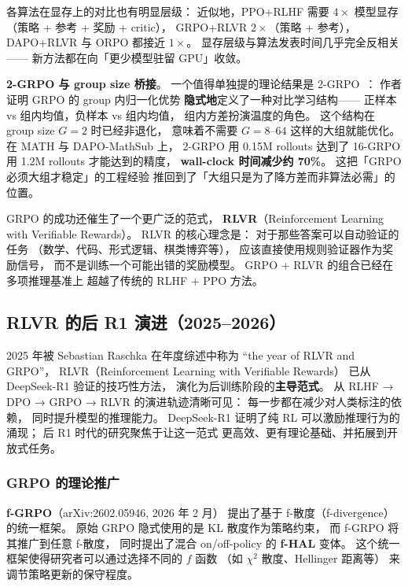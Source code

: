 各算法在显存上的对比也有明显层级：
近似地，PPO+RLHF 需要 $4\times$ 模型显存
（策略 + 参考 + 奖励 + critic），
GRPO+RLVR $2\times$（策略 + 参考），
DAPO+RLVR 与 ORPO 都接近 $1\times$。
显存层级与算法发表时间几乎完全反相关——
新方法都在向「更少模型驻留 GPU」收敛。

\textbf{2-GRPO 与 group size 桥接}。
一个值得单独提的理论结果是 2-GRPO~\cite{2grpo2026}：
作者证明 GRPO 的 group 内归一化优势
\textbf{隐式地}定义了一种对比学习结构——
正样本 vs 组内均值，负样本 vs 组内均值，
组内方差扮演温度的角色。
这个结构在 group size $G = 2$ 时已经非退化，
意味着不需要 $G = 8$--$64$ 这样的大组就能优化。
在 MATH 与 DAPO-MathSub 上，
2-GRPO 用 0.15M rollouts 达到了
16-GRPO 用 1.2M rollouts 才能达到的精度，
\textbf{wall-clock 时间减少约 70\%}。
这把「GRPO 必须大组才稳定」的工程经验
推回到了「大组只是为了降方差而非算法必需」的位置。

GRPO 的成功还催生了一个更广泛的范式，
\textbf{RLVR}（Reinforcement Learning with Verifiable Rewards）。
RLVR 的核心理念是：
对于那些答案可以自动验证的任务
（数学、代码、形式逻辑、棋类博弈等），
应该直接使用规则验证器作为奖励信号，
而不是训练一个可能出错的奖励模型。
GRPO + RLVR 的组合已经在多项推理基准上
超越了传统的 RLHF + PPO 方法。

\subsection{RLVR 的后 R1 演进（2025--2026）}

2025 年被 Sebastian Raschka 在年度综述中称为
“the year of RLVR and GRPO”，
RLVR（Reinforcement Learning with Verifiable Rewards）
已从 DeepSeek-R1 验证的技巧性方法，
演化为后训练阶段的\textbf{主导范式}。
从 RLHF → DPO → GRPO → RLVR 的演进轨迹清晰可见：
每一步都在减少对人类标注的依赖，
同时提升模型的推理能力。
DeepSeek-R1 证明了纯 RL 可以激励推理行为的涌现；
后 R1 时代的研究聚焦于让这一范式
更高效、更有理论基础、并拓展到开放式任务。

\subsubsection{GRPO 的理论推广}


\textbf{f-GRPO}（arXiv:2602.05946, 2026 年 2 月）
提出了基于 f-散度（f-divergence）的统一框架。
原始 GRPO 隐式使用的是 KL 散度作为策略约束，
而 f-GRPO 将其推广到任意 f-散度，
同时提出了混合 on/off-policy 的 \textbf{f-HAL} 变体。
这个统一框架使得研究者可以通过选择不同的 $f$ 函数
（如 $\chi^2$ 散度、Hellinger 距离等）
来调节策略更新的保守程度。

